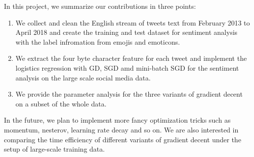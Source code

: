 \documentclass[sigconf]{acmart}
\begin{document}
In this project, we summarize our contributions in three points:

\begin{enumerate}  
\item We collect and clean the English stream of tweets text from February 2013 to April 2018 and create the training and test dataset for sentiment analysis with the label infromation from emojis and emoticons.
\item We extract the four byte character feature for each tweet and implement the logistics regression with GD, SGD amd mini-batch SGD for the sentiment analysis on the large scale social media data.
\item We provide the parameter analysis for the three variants of gradient decent on a subset of the whole data.
\end{enumerate}

In the future, we plan to implement more fancy optimization tricks such as momentum, nesterov, learning rate decay and so on. We are also interested in comparing the time efficiency of different variants of gradient decent under the setup of large-scale training data.


\normalsize

{\vskip 12pt}
\noindent




\end{document}
